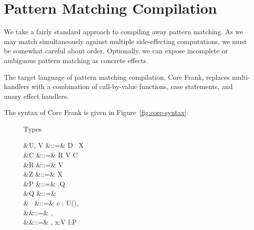\section{Pattern Matching Compilation}
\label{sec:core}

We take a fairly standard approach to compiling away pattern
matching. As we may match simultaneously against multiple
side-effecting computations, we must be somewhat careful about
order. Optionally, we can expose incomplete or ambiguous pattern
matching as concrete effects.

The target language of pattern matching compilation, Core Frank,
replaces multi-handlers with a combination of call-by-value functions,
case statements, and unary effect handlers.

The syntax of Core Frank is given in Figure~\ref{fig:core-syntax}.
%
\begin{figure}
Types
\begin{syntax}
       &U, V          &::=& D~ \mid {} \mid X \\
 &C             &::=& R \mid V \to C \\
    &R             &::=& \effbox{\sigs}V
\\[1ex]
  &Z             &::=& X \mid \varepsilon \\
    &P             &::=& \forall {}.Q \\
       &Q             &::=& 
\\[1ex]
   &\sig~ &::=& \cdot \mid c : U(), \sig~ \\
      &\sigs         &::=&
  \emptyset \mid \sigs, \sig~ \mid \varepsilon
\\[1ex]
                    &\Gamma        &::=& \cdot \mid \Gamma, x:V \mid f:P \\
\end{syntax}


\end{figure}
